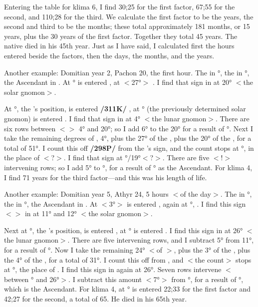 Entering the table for klima 6, I find 30;25 for the first factor, 67;55 for the second, and 110;28 for the third. We calculate the first factor to be the years, the second and third to be the months; these total approximately 181 months, or 15 years, plus the 30 years of the first factor. Together they total 45 years. The native died in his 45th year.
Just as I have said, I calculated first the hours entered beside the factors, then the days, the months, and the years.

Another example: Domitian year 2, Pachon 20, the first hour. The \Sun\xspace in \Taurus\xspace 27°, the \Moon\xspace in \Virgo\xspace 20°, the Ascendant in \Gemini. At \Taurus\xspace 27° is entered \Aries, at \Aries\xspace $<$27°$>$ \Cancer. I find that
sign in \Gemini\xspace at 20° $<$the solar gnomon$>$. 

At \Virgo\xspace 20°, the \Moon’s position, is entered \textbf{/311K/} \Cancer, at \Cancer\xspace 20° (the previously determined solar gnomon) is entered \Virgo. I find that sign in \Gemini\xspace at 4°
$<$the lunar gnomon$>$. There are six rows between $<$\Gemini$>$ 4° and 20°; so I add 6° to the 20° for a result of \Gemini\xspace 26°. Next I take the remaining degrees of \Gemini, 4°, plus the 27° of the \Sun, plus the 20° of the \Moon, for a total of 51°. I count this off \textbf{/298P/} from the \Moon’s sign, and the count stops at \Libra\xspace 21°, in the place of $<$\Cancer?$>$. I find that sign at \Gemini\xspace 11°/19°$<$?$>$. There are five $<$!$>$ intervening rows; so I add 5° to \Gemini\xspace 26°, for a result of \Cancer\xspace 1° as the Ascendant. For klima 4, I find 71 years for the third factor—and this was his length of life.

Another example: Domitian year 5, Athyr 24, 5 hours $<$of the day$>$. The \Sun\xspace in °, the \Moon\xspace in \Gemini\xspace 4°, the Ascendant in \Pisces. At \Sagittarius\xspace $<$3°$>$ is entered \Sagittarius, again at \Sagittarius\xspace 3°, \Sagittarius. I find this sign $<$\Sagittarius$>$ in \Pisces\xspace at 11° and 12° $<$the solar gnomon$>$. 

Next at \Gemini\xspace 4°, the \Moon’s position, is entered \Virgo, at \Virgo\xspace 11° is entered \Scorpio. I find this sign in \Pisces\xspace at 26° $<$the lunar gnomon$>$. There are five intervening rows, and I subtract 5° from 11°, for a result of \Pisces\xspace 6°. Now I take the remaining 24° $<$of \Pisces$>$, plus the 3° of the \Sun, plus the 4° of the \Moon, for a total of 31°. I count this off from \Gemini, and $<$the count$>$ stops at \Cancer\xspace 1°, the place of \Scorpio. I find this sign in \Pisces\xspace again at 26°. Seven rows intervene $<$between \Pisces\xspace 6° and 26°$>$. I subtract this amount $<$7°$>$ from \Pisces\xspace 6°, for a result of \Aquarius\xspace 29°, which is the Ascendant. For klima 4, at \Aquarius\xspace 29° is entered 22;33 for the first factor and 42;27 for the second, a total of 65. He died in his
65th year.

